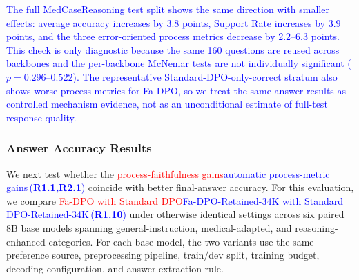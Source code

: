 \documentclass[a4paper,fleqn,doubleblind]{cas-sc}
\DeclareRobustCommand{\deleted}[1]{\textcolor{red}{\sout{#1}}}
\DeclareRobustCommand{\added}[1]{\textcolor{blue}{#1}}
\DeclareRobustCommand{\revtag}[1]{\textcolor{blue}{\scriptsize\,(\textbf{#1})}}
\begin{document}
\added{The full MedCaseReasoning test split shows the same direction with smaller effects: average accuracy increases by 3.8 points, Support Rate increases by 3.9 points, and the three error-oriented process metrics decrease by 2.2--6.3 points. This check is only diagnostic because the same 160 questions are reused across backbones and the per-backbone McNemar tests are not individually significant ($p=0.296$--$0.522$). The representative Standard-DPO-only-correct stratum also shows worse process metrics for Fa-DPO, so we treat the same-answer results as controlled mechanism evidence, not as an unconditional estimate of full-test response quality.}

\subsubsection{Answer Accuracy Results}
We next test whether the \deleted{process-faithfulness gains}\added{automatic process-metric gains}\revtag{R1.1,R2.1} coincide with better final-answer accuracy. For this evaluation, we compare \deleted{Fa-DPO with Standard DPO}\added{Fa-DPO-Retained-34K with Standard DPO-Retained-34K}\revtag{R1.10} under otherwise identical settings across six paired 8B base models spanning general-instruction, medical-adapted, and reasoning-enhanced categories. For each base model, the two variants use the same preference source, preprocessing pipeline, train/dev split, training budget, decoding configuration, and answer extraction rule.
\end{document}
